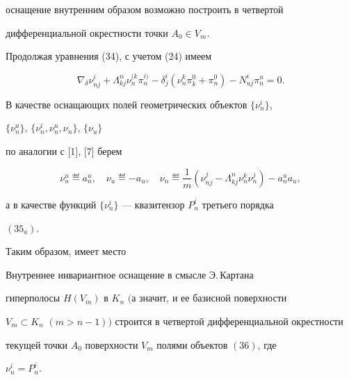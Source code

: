 оснащение внутренним образом возможно построить в четвертой 


дифференциальной окрестности точки $A_0\in V_m$. 


 


Продолжая уравнения (34), с учетом (24) имеем 


$$ 


\nabla_\delta\nu^i_{nj}+\Lambda^n_{kj}\nu{}^{(k}_n\pi{}^{i)}_n 


-\delta^i_j(\nu^k_n\pi^0_k+\pi^0_n)-N^i_{uj}\pi^u_n=0. 


$$ 


 


В качестве оснащающих полей геометрических объектов $\{\nu^i_n\}$, 


$\{\nu^u_n\}$, $\{\nu^i_n,\nu^u_n,\nu_n\}$, $\{\nu_u\}$ 


по аналогии с [1], [7] берем 


\begin{equation} 


\nu^u_n\eqdef a^u_n,\quad \nu_u\eqdef -a_u,\quad 


\nu_n\eqdef\frac{1}{m}(\nu^j_{nj}-\Lambda^n_{kj} 


\nu^k_n\nu^j_n)-a^u_n a_u, 


\end{equation} 


а в качестве функций $\{\nu^i_n\}$ --- квазитензор $P^i_n$ третьего порядка 


$(35_a)$. 


 


Таким образом, имеет место 


 


\begin{thm} 


Внутреннее инвариантное оснащение в смысле Э.\,Картана 


гиперполосы $H(V_m)$ в $K_n$ $($а значит, и ее базисной поверхности 


$V_m\subset K_n$ $(m>n-1))$ строится в четвертой дифференциальной окрестности 


текущей точки $A_0$ поверхности $V_m$ полями объектов $(36)$, где 


$\nu^i_n=P^i_n$. 


\end{thm} 


